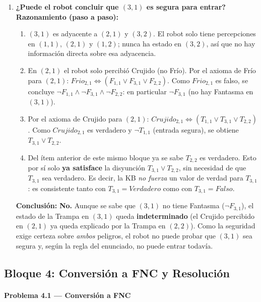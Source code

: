\begin{enumerate}
    \item \textbf{¿Puede el robot concluir que $(3,1)$ es segura para entrar?}\\
    \textbf{Razonamiento (paso a paso):}
    \begin{enumerate}
        \item $(3,1)$ es adyacente a $(2,1)$ y $(3,2)$. El robot solo tiene percepciones en $(1,1)$,
        $(2,1)$ y $(1,2)$; nunca ha estado en $(3,2)$, así que no hay información directa sobre esa
        adyacencia.
        \item En $(2,1)$ el robot solo percibió Crujido (no Frío). Por el axioma de Frío para
        $(2,1)$: $Frio_{2,1} \Leftrightarrow (F_{1,1}\lor F_{3,1}\lor F_{2,2})$. Como $Frio_{2,1}$ es
        falso, se concluye $\neg F_{1,1} \land \neg F_{3,1} \land \neg F_{2,2}$: en particular
        $\neg F_{3,1}$ (no hay Fantasma en $(3,1)$).
        \item Por el axioma de Crujido para $(2,1)$: $Crujido_{2,1} \Leftrightarrow (T_{1,1}\lor
        T_{3,1}\lor T_{2,2})$. Como $Crujido_{2,1}$ es verdadero y $\neg T_{1,1}$ (entrada segura),
        se obtiene $T_{3,1}\lor T_{2,2}$.
        \item Del ítem anterior de este mismo bloque ya se sabe $T_{2,2}$ es verdadero. Esto por sí
        solo \textbf{ya satisface} la disyunción $T_{3,1}\lor T_{2,2}$, sin necesidad de que $T_{3,1}$
        sea verdadero. Es decir, la KB \emph{no fuerza} un valor de verdad para $T_{3,1}$: es
        consistente tanto con $T_{3,1}=Verdadero$ como con $T_{3,1}=Falso$.
    \end{enumerate}
    \textbf{Conclusión:} \textbf{No.} Aunque se sabe que $(3,1)$ no tiene Fantasma ($\neg F_{3,1}$),
    el estado de la Trampa en $(3,1)$ queda \textbf{indeterminado} (el Crujido percibido en $(2,1)$ ya
    queda explicado por la Trampa en $(2,2)$). Como la seguridad exige certeza sobre \emph{ambos}
    peligros, el robot no puede probar que $(3,1)$ sea segura y, según la regla del enunciado, no
    puede entrar todavía.
\end{enumerate}

\subsection{Bloque 4: Conversión a FNC y Resolución}

\paragraph{Problema 4.1 --- Conversión a FNC}

